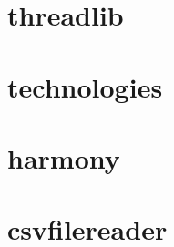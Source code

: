 \documentclass[10pt, a4paper]{article}
\begin{document}
\section{threadlib}


\section{technologies}


\section{harmony}


\section{csvfilereader}

\end{document}
